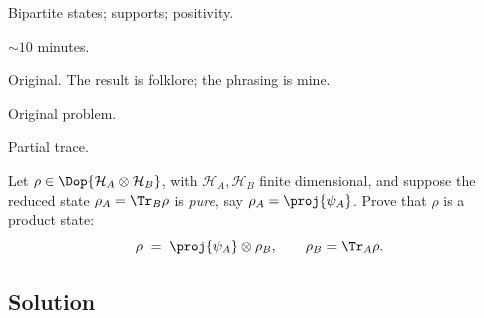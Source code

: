 
\begin{daymeta}
  \item[Topic] Bipartite states; supports; positivity.
  \item[Estimated time] $\sim 10$ minutes.
  \item[Origin] Original. The result is folklore; the phrasing is mine.
  \item[Source] Original problem.
  \item[Prerequisites] Partial trace.
\end{daymeta}

\begin{problem}
Let $\rho\in\Dop{\mathcal H_A\otimes\mathcal H_B}$, with $\mathcal H_A,\mathcal H_B$
finite dimensional, and suppose the reduced state $\rho_A=\Tr_B\rho$ is \emph{pure},
say $\rho_A=\proj{\psi_A}$. Prove that $\rho$ is a product state:
\[
  \rho \;=\; \proj{\psi_A}\otimes\rho_B,
  \qquad \rho_B=\Tr_A\rho .
\]
\end{problem}

\subsection*{Solution}

